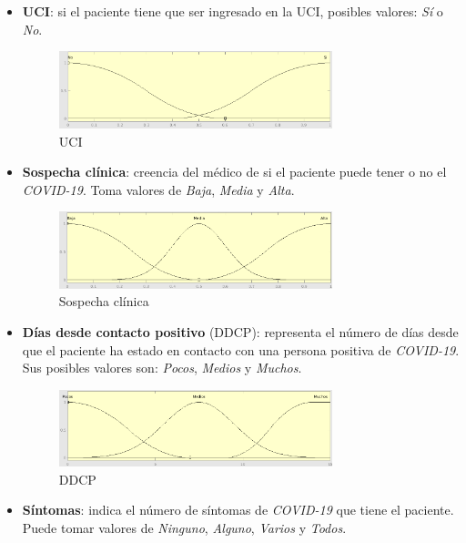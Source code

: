 \documentclass[12pt,a4paper, xcolor=table]{article}
\begin{document}
\begin{center}
\begin{itemize}
  \item \textbf{UCI}: si el paciente tiene que ser ingresado en la UCI, posibles valores: \textit{Sí} o \textit{No}.

  \begin{figure}[!h]
      \centering
      \includegraphics[width=300px]{img/UCI.png}
      \caption{UCI}
  \end{figure}

  \item \textbf{Sospecha clínica}: creencia del médico de si el paciente puede tener o no el \textit{COVID-19}. Toma valores de \textit{Baja}, \textit{Media} y \textit{Alta}.

  \begin{figure}[!h]
      \centering
      \includegraphics[width=300px]{img/sospecha_clinica.png}
      \caption{Sospecha clínica}
  \end{figure}

  \item \textbf{Días desde contacto positivo} (DDCP): representa el número de días desde que el paciente ha estado en contacto con una persona positiva de \textit{COVID-19}. Sus posibles valores son: \textit{Pocos}, \textit{Medios} y \textit{Muchos}.

  \begin{figure}[!h]
      \centering
      \includegraphics[width=300px]{img/dias_desde_cntcto_positivo.png}
      \caption{DDCP}
  \end{figure}

  \item \textbf{Síntomas}: indica el número de síntomas de \textit{COVID-19} que tiene el paciente. Puede tomar valores de \textit{Ninguno}, \textit{Alguno}, \textit{Varios} y \textit{Todos}.


\end{itemize}
\end{center}
\end{document}
